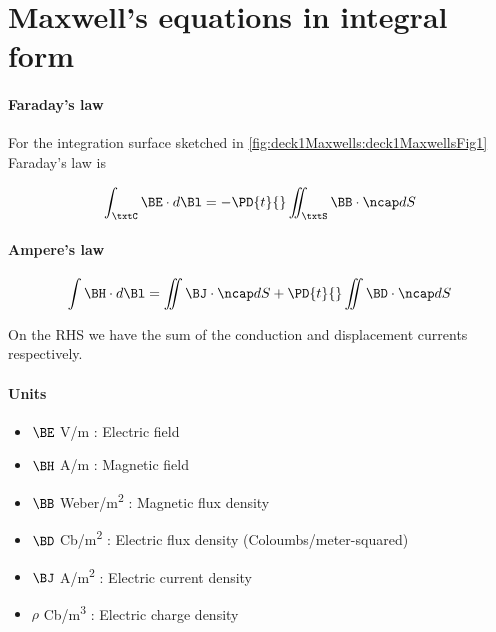 %
%
\section{Maxwell's equations in integral form}
\paragraph{Faraday's law}

For the integration surface sketched in \cref{fig:deck1Maxwells:deck1MaxwellsFig1} Faraday's law is


\begin{equation}\label{eqn:uwavesLecture1:20}
\int_\txtC \BE \cdot d\Bl = - \PD{t}{} \iint_\txtS \BB \cdot \ncap dS
\end{equation}

\paragraph{Ampere's law}
\begin{equation}\label{eqn:uwavesLecture1:40}
\int \BH \cdot d\Bl = \iint \BJ \cdot \ncap dS + \PD{t}{} \iint \BD \cdot \ncap dS
\end{equation}

On the RHS we have the sum of the conduction and displacement currents respectively.

\paragraph{Units}

\begin{itemize}
\item \( \BE \) \si{V/m} : Electric field
\item \( \BH \) \si{A/m} : Magnetic field
\item \( \BB \) \si{Weber/m^2} : Magnetic flux density
\item \( \BD \) \si{Cb/m^2} : Electric flux density (Coloumbs/meter-squared)
\item \( \BJ \) \si{A/m^2} : Electric current density
\item \( \rho \) \si{Cb/m^3} : Electric charge density
\end{itemize}

